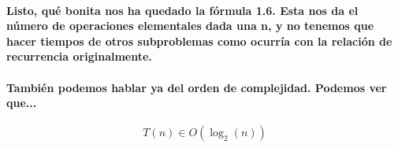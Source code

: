 \documentclass{book}
\begin{document}
	\paragraph{Listo, qué bonita nos ha quedado la fórmula 1.6. Esta nos da el número de operaciones elementales dada una n, y no tenemos que hacer tiempos de otros subproblemas como ocurría con la relación de recurrencia originalmente.}
	\paragraph{También podemos hablar ya del orden de complejidad. Podemos ver que...}
	\begin{equation}
		T(n) \in O(\log_{2}(n)) \nonumber
	\end{equation}		
\end{document}
